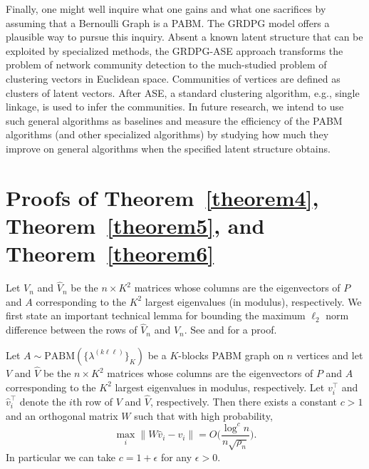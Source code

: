 \documentclass[12pt]{article}
\begin{document}
Finally, one might well inquire what one gains and what one sacrifices
by assuming that a Bernoulli Graph is a PABM.  The GRDPG model offers
a plausible way to pursue this inquiry.  Absent a known latent
structure that can be exploited by specialized methods, the GRDPG-ASE
approach transforms the problem of network community detection to the
much-studied problem of clustering vectors in Euclidean space.
Communities of vertices are defined as clusters of latent vectors.
After ASE, a standard clustering algorithm, e.g., single linkage, is
used to infer the communities.  In future research, we intend to use
such general algorithms as baselines and measure the efficiency of the
PABM algorithms (and other specialized algorithms) by studying how
much they improve on general algorithms when the specified latent
structure obtains.

\appendix

\hypertarget{proofs}{%
\section{Proofs of Theorem~\ref{theorem4}, Theorem~\ref{theorem5}, and Theorem~\ref{theorem6}}}
Let \(V_n\) and \(\hat{V}_n\)
be the $n \times K^2$ matrices whose columns are the eigenvectors of \(P\) and \(A\) corresponding to the
$K^2$ largest eigenvalues (in modulus), respectively. 
We first state an important technical lemma for bounding the maximum
$\ell_2$ norm difference between the rows of $\hat{V}_n$ and
$V_n$. See \citet{cape_biometrika} and 
\citet[Lemma~5]{rubindelanchy2017statistical} for a proof. 

\begin{lemma}
\label{lem:technical}
Let $A \sim \mathrm{PABM}(\{\lambda^{(k \ell \ell)}\}_{K})$ be a $K$-blocks
PABM graph on $n$ vertices and let \(V\) and \(\hat{V}\)
be the $n \times K^2$ matrices whose columns are the eigenvectors of 
\(P\) and \(A\) corresponding to the
$K^2$ largest eigenvalues in modulus, respectively.
Let \(v_i^\top\) and \(\hat{v}_i^\top\) denote the $i$th 
row of \(V\) and \(\hat{V}\), respectively. 
Then there exists a constant $c > 1$ and an orthogonal matrix $W$ such
that with high probability,
$$\max_{i} \|W \hat{v}_i - v_i\|  = O\Big(\frac{\log^{c}n}{n \sqrt{\rho_n}} \Big).$$
In particular we can take $c = 1 + \epsilon$ for any $\epsilon > 0$. 
\end{lemma}
\end{document}
